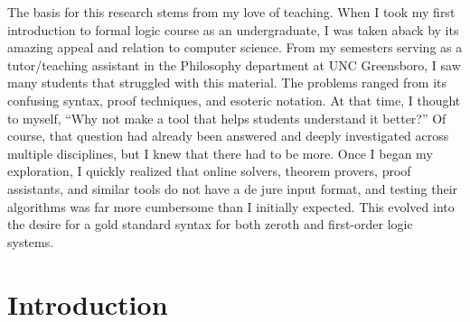 \documentclass[ms]{uncgdissertationexp2}
\theoremstyle{plain}
\theoremstyle{definition}
\theoremstyle{remark}
\begin{document}
\begin{preface}
	The basis for this research stems from my love of teaching. When I took my first introduction to formal logic course as an undergraduate, I was taken aback by its amazing appeal and relation to computer science. From my semesters serving as a tutor/teaching assistant in the Philosophy department at UNC Greensboro, I saw many students that struggled with this material. The problems ranged from its confusing syntax, proof techniques, and esoteric notation. At that time, I thought to myself, ``Why not make a tool that helps students understand it better?'' Of course, that question had already been answered and deeply investigated across multiple disciplines, but I knew that there had to be more. Once I began my exploration, I quickly realized that online solvers, theorem provers, proof assistants, and similar tools do not have a de jure input format, and testing their algorithms was far more cumbersome than I initially expected. This evolved into the desire for a gold standard syntax for both zeroth and first-order logic systems.
\end{preface}

\tableofcontents 
\listoftables   
\listoffigures   

\mainmatter %
\chapter{Introduction}
\end{document}
